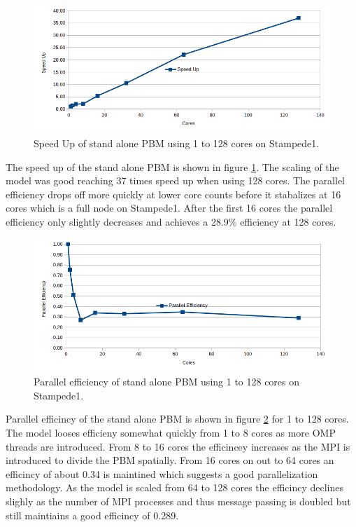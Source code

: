 \begin{figure}[H]
\centering
\includegraphics[scale=0.5]{fig_rslts_sa_pbm_speed_up.png}
\caption{Speed Up of stand alone PBM using 1 to 128 cores on Stampede1. }
\label{fig:rslts_sa_pbm_speedup}
\end{figure}

The speed up of the stand alone PBM  is shown in figure \ref{fig:rslts_sa_pbm_speedup}. The scaling of the model was good reaching 37 times speed up when using 128 cores. The parallel efficiency drops off more quickly at lower core counts before it stabalizes at 16 cores which is a full node on Stampede1. After the first 16 cores the parallel efficiency only slightly decreases and achieves a 28.9$\%$ efficiency at 128 cores.


\begin{figure}[H]
\begin{center}
\includegraphics[scale=0.5]{fig_rslts_sa_pbm_parallel_efficiency.png}
\caption{Parallel efficiency of stand alone PBM using 1 to 128 cores on Stampede1. }
\label{fig:rslts_sa_pbm_pll_effic}
\end{center}
\end{figure}

Parallel efficincy of the stand alone PBM is shown in figure \ref{fig:rslts_sa_pbm_pll_effic} for 1 to 128 cores. The model looses efficieny somewhat quickly from 1 to 8 cores as more OMP threads are introduced. From 8 to 16 cores the efficincey increases as the MPI is introduced to divide the PBM spatially. From 16 cores on out to 64 cores an efficincy of about 0.34 is maintined which suggests a good parallelization methodology. As the model is scaled from 64 to 128 cores the efficincy declines slighly as the number of MPI processes and thus message passing is doubled but still maintiains a good efficincy of 0.289.  

